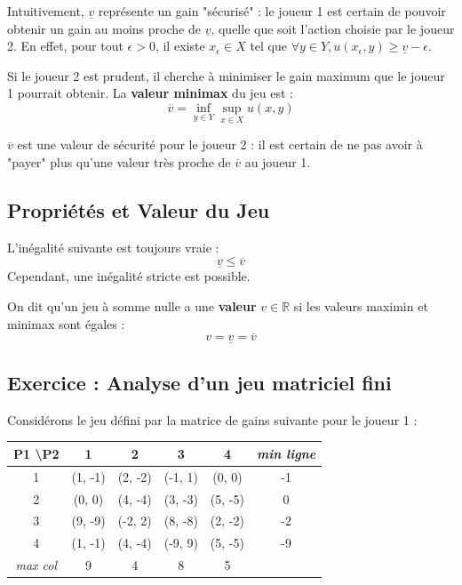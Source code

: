 \begin{remark}
Intuitivement, $\underline{v}$ représente un gain "sécurisé" : le joueur 1 est certain de pouvoir obtenir un gain au moins proche de $\underline{v}$, quelle que soit l'action choisie par le joueur 2. En effet, pour tout $\epsilon > 0$, il existe $x_\epsilon \in X$ tel que $\forall y \in Y, u(x_\epsilon, y) \ge \underline{v} - \epsilon$.
\end{remark}

\begin{definition}
Si le joueur 2 est prudent, il cherche à minimiser le gain maximum que le joueur 1 pourrait obtenir. La \textbf{valeur minimax} du jeu est :
$$\overline{v} = \inf_{y \in Y} \sup_{x \in X} u(x, y)$$
\end{definition}

\begin{remark}
$\overline{v}$ est une valeur de sécurité pour le joueur 2 : il est certain de ne pas avoir à "payer" plus qu'une valeur très proche de $\overline{v}$ au joueur 1.
\end{remark}

\subsection{Propriétés et Valeur du Jeu}

\begin{proposition}
L'inégalité suivante est toujours vraie :
$$\underline{v} \le \overline{v}$$
Cependant, une inégalité stricte est possible.
\end{proposition}

\begin{definition}
On dit qu'un jeu à somme nulle a une \textbf{valeur} $v \in \mathbb{R}$ si les valeurs maximin et minimax sont égales :
$$v = \underline{v} = \overline{v}$$
\end{definition}

\subsection{Exercice : Analyse d'un jeu matriciel fini}

Considérons le jeu défini par la matrice de gains suivante pour le joueur 1 :
\begin{center}
\begin{tabular}{c|cccc|c}
P1 \textbackslash P2 & 1 & 2 & 3 & 4 & \textit{min ligne} \\ \hline
1 & (1, -1) & (2, -2) & (-1, 1) & (0, 0) & -1 \\
2 & (0, 0) & (4, -4) & (3, -3) & (5, -5) & 0 \\
3 & (9, -9) & (-2, 2) & (8, -8) & (2, -2) & -2 \\
4 & (1, -1) & (4, -4) & (-9, 9) & (5, -5) & -9 \\ \hline
\textit{max col} & 9 & 4 & 8 & 5 & 
\end{tabular}
\end{center}

